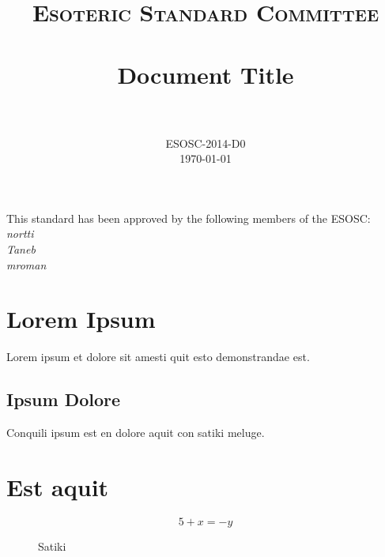 \documentclass[paper=a4, fontsize=11pt]{scrartcl}
\title{
		\usefont{OT1}{bch}{b}{n}
		\normalfont \normalsize \textsc{Esoteric Standard Committee} \\ [25pt]
		\horrule{0.5pt} \\[0.4cm]
		\huge Document Title \\
		\horrule{2pt} \\[0.5cm]
}
\author{
		\normalfont 								\normalsize
        ESOSC-2014-D0\\[-3pt]		\normalsize
        \today
}
\date{}
\numberwithin{equation}{section}
\numberwithin{figure}{section}
\numberwithin{table}{section}
\begin{document}
\maketitle

\begin{center}
This standard has been approved by the following members of the ESOSC:\\
\textit{
nortti\\
Taneb\\
mroman}
\end{center}

\section{Lorem Ipsum}

Lorem ipsum et dolore sit amesti quit esto demonstrandae est. 

\subsection{Ipsum Dolore}

Conquili ipsum est en dolore aquit con satiki meluge. 

\newpage

\section{Est aquit}

\begin{figure}
 \begin{equation}
   5 + x = -y
 \end{equation}
 \caption{Satiki}
\end{figure}
\end{document}
